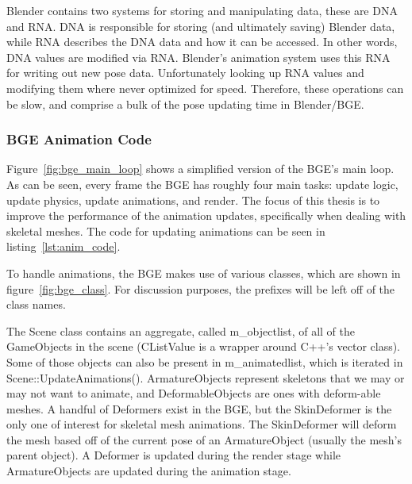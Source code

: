 Blender contains two systems for storing and manipulating data, these are DNA and RNA. DNA is responsible for storing (and ultimately saving) Blender data, while RNA describes the DNA data and how it can be accessed. In other words, DNA values are modified via RNA. Blender's animation system uses this RNA for writing out new pose data. Unfortunately looking up RNA values and modifying them where never optimized for speed. Therefore, these operations can be slow, and comprise a bulk of the pose updating time in Blender/BGE. 


\subsubsection{BGE Animation Code}
\label{sec:bge_overview}


Figure~\ref{fig:bge_main_loop} shows a simplified version of the BGE's main loop. As can be seen, every frame the BGE has roughly four main tasks: update logic, update physics, update animations, and render. The focus of this thesis is to improve the performance of the animation updates, specifically when dealing with skeletal meshes. The code for updating animations can be seen in listing~\ref{lst:anim_code}.


To handle animations, the BGE makes use of various classes, which are shown in figure~\ref{fig:bge_class}. For discussion purposes, the prefixes will be left off of the class names.


The Scene class contains an aggregate, called m\_objectlist, of all of the GameObjects in the scene (CListValue is a wrapper around C++'s vector class). Some of those objects can also be present in m\_animatedlist, which is iterated in Scene::UpdateAnimations(). ArmatureObjects represent skeletons that we may or may not want to animate, and DeformableObjects are ones with deform-able meshes. A handful of Deformers exist in the BGE, but the SkinDeformer is the only one of interest for skeletal mesh animations. The SkinDeformer will deform the mesh based off of the current pose of an ArmatureObject (usually the mesh's parent object). A Deformer is updated during the render stage while ArmatureObjects are updated during the animation stage.


